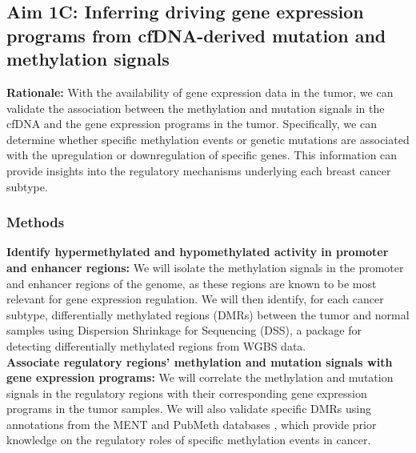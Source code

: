 \documentclass[11pt]{article}
\begin{document}
\subsection*{Aim 1C: Inferring driving gene expression programs from cfDNA-derived mutation and methylation signals}
\textbf{Rationale:}
With the availability of gene expression data in the tumor, we can validate the association between the methylation and mutation signals in the cfDNA and the gene expression programs in the tumor. Specifically, we can determine whether specific methylation events or genetic mutations are associated with the upregulation or downregulation of specific genes. This information can provide insights into the regulatory mechanisms underlying each breast cancer subtype.
\subsubsection*{Methods}
\textbf{Identify hypermethylated and hypomethylated activity in promoter and enhancer regions:} We will isolate the methylation signals in the promoter and enhancer regions of the genome, as these regions are known to be most relevant for gene expression regulation. 
We will then identify, for each cancer subtype, differentially methylated regions (DMRs) between the tumor and normal samples using Dispersion Shrinkage for Sequencing (DSS), a package for detecting differentially methylated regions from WGBS data. \cite{feng_differential_2019}
\medskip \\
\textbf{Associate regulatory regions' methylation and mutation signals with gene expression programs:} We will correlate the methylation and mutation signals in the regulatory regions with their corresponding gene expression programs in the tumor samples. We will also validate specific DMRs using annotations from the MENT and PubMeth databases \cite{zhang_unlocking_2023}, which provide prior knowledge on the regulatory roles of specific methylation events in cancer.
\end{document}
